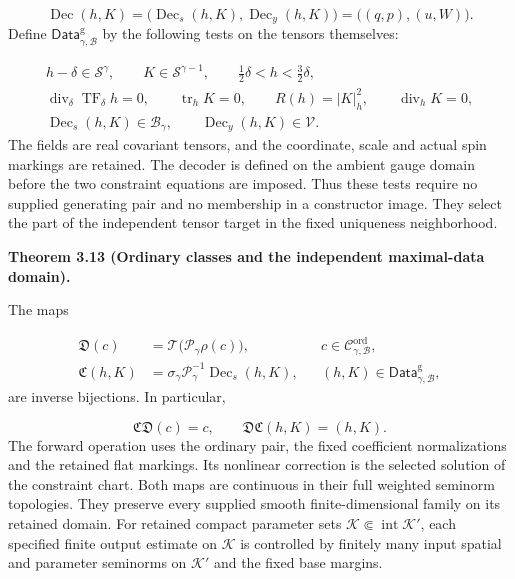 \documentclass[
  english,
  11pt,
  reqno]{amsart}
\makeatletter
\newcommand{\pandocstatementheading}[1]{%
  \par\addpenalty{\@beginparpenalty}%
  \addvspace{.5\baselineskip plus .2\baselineskip minus .2\baselineskip}%
  {\normalfont\bfseries #1\par}%
  \nobreak\@afterindenttrue\@afterheading
}
\makeatother
\begin{document}
\label{eq:online-ordinary-whole-decoder-parts} \[
\operatorname{Dec}(h,K)
=\bigl(\operatorname{Dec}_{s}(h,K),
       \operatorname{Dec}_{y}(h,K)\bigr)
=\bigl((q,p),(u,W)\bigr).
\] Define \(\mathsf{Data}^{\mathrm g}_{\gamma,\mathcal B}\) by the
following tests on the tensors themselves:

\label{eq:online-ordinary-independent-data-domain} \[
\begin{gathered}
h-\delta\in\mathscr S^\gamma,
\qquad K\in\mathscr S^{\gamma-1},
\qquad \tfrac12\delta<h<\tfrac32\delta,\\
\operatorname{div}_\delta\operatorname{TF}_\delta h=0,
\qquad \operatorname{tr}_hK=0,
\qquad R(h)=|K|_h^2,
\qquad\operatorname{div}_hK=0,\\
\operatorname{Dec}_{s}(h,K)\in\mathcal B_\gamma,
\qquad\operatorname{Dec}_{y}(h,K)\in\mathcal V.
\end{gathered}
\] The fields are real covariant tensors, and the coordinate, scale and
actual spin markings are retained. The decoder is defined on the ambient
gauge domain before the two constraint equations are imposed. Thus these
tests require no supplied generating pair and no membership in a
constructor image. They select the part of the independent tensor target
in the fixed uniqueness neighborhood.

\pandocstatementheading{\leavevmode{}\label{thm:online-ordinary-pair-data-bijection}Theorem 3.13 (Ordinary classes and the independent maximal-data domain).}

The maps

\label{eq:online-ordinary-data-constructor-and-inverse}
\[
\begin{aligned}
\mathfrak D(c)
&=\mathcal T\bigl(\mathscr P_\gamma\rho(c)\bigr),
&&c\in\mathscr C^{\mathrm{ord}}_{\gamma,\mathcal B},\\
\mathfrak C(h,K)
&=\sigma_\gamma\mathscr P_\gamma^{-1}
       \operatorname{Dec}_{s}(h,K),
&&(h,K)\in\mathsf{Data}^{\mathrm g}_{\gamma,\mathcal B},
\end{aligned}
\] are inverse bijections. In particular,

\label{eq:online-ordinary-data-two-inverse-identities} \[
\mathfrak C\mathfrak D(c)=c,
\qquad
\mathfrak D\mathfrak C(h,K)=(h,K).
\] The forward operation uses the ordinary pair, the fixed coefficient
normalizations and the retained flat markings. Its nonlinear correction
is the selected solution of the constraint chart. Both maps are
continuous in their full weighted seminorm topologies. They preserve
every supplied smooth finite-dimensional family on its retained domain.
For retained compact parameter sets
\(\mathcal K\Subset\operatorname{int}\mathcal K'\), each specified
finite output estimate on \(\mathcal K\) is controlled by finitely many
input spatial and parameter seminorms on \(\mathcal K'\) and the fixed
base margins.
\end{document}
